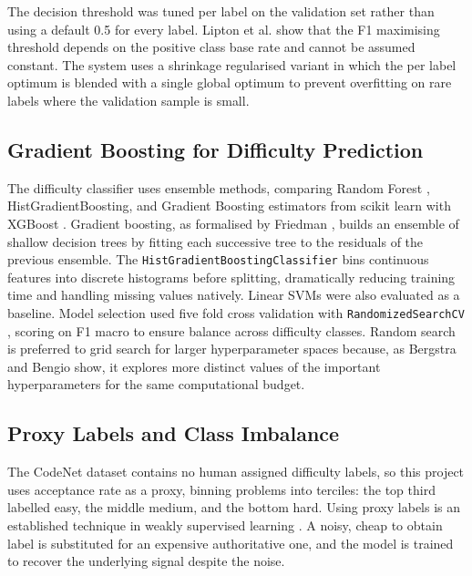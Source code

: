 The decision threshold was tuned per label on the validation set
rather than using a default 0.5 for every label. Lipton et al.
\cite{lipton2014thresholding} show that the F1 maximising threshold
depends on the positive class base rate and cannot be assumed constant.
The system uses a shrinkage regularised variant in which the per label
optimum is blended with a single global optimum to prevent overfitting
on rare labels where the validation sample is small.

\subsection{Gradient Boosting for Difficulty Prediction}

The difficulty classifier uses ensemble methods, comparing Random
Forest \cite{breiman2001randomforests}, HistGradientBoosting, and
Gradient Boosting estimators from scikit learn \cite{pedregosa2011}
with XGBoost \cite{chen2016xgboost}. Gradient boosting, as formalised
by Friedman \cite{friedman2001gradient}, builds an ensemble of shallow
decision trees by fitting each successive tree to the residuals of the
previous ensemble. The \texttt{HistGradientBoostingClassifier} bins
continuous features into discrete histograms before splitting,
dramatically reducing training time and handling missing values
natively. Linear SVMs \cite{cortes1995svm} were also evaluated as a
baseline. Model selection used five fold cross validation with
\texttt{RandomizedSearchCV} \cite{bergstra2012random}, scoring on F1
macro to ensure balance across difficulty classes. Random search is
preferred to grid search for larger hyperparameter spaces because, as
Bergstra and Bengio show, it explores more distinct values of the
important hyperparameters for the same computational budget.

\subsection{Proxy Labels and Class Imbalance}

The CodeNet dataset \cite{puri2021codenet} contains no human assigned
difficulty labels, so this project uses acceptance rate as a proxy,
binning problems into terciles: the top third labelled easy, the
middle medium, and the bottom hard. Using proxy labels is an
established technique in weakly supervised learning
\cite{zhou2017weaksupervision}. A noisy, cheap to obtain label is
substituted for an expensive authoritative one, and the model is
trained to recover the underlying signal despite the noise.

